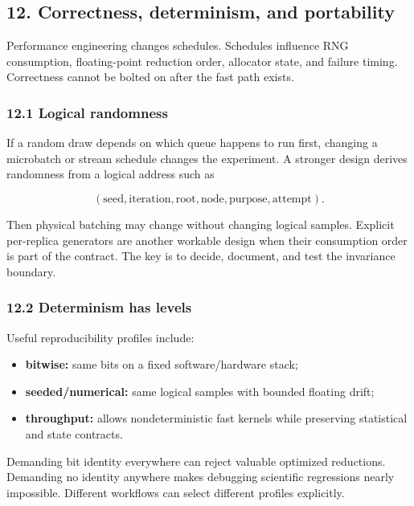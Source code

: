 \documentclass[
  10pt,
  letterpaper,
]{article}
\providecommand{\tightlist}{%
  \setlength{\itemsep}{0pt}\setlength{\parskip}{0pt}}
\begin{document}
\subsection{12. Correctness, determinism, and
portability}\label{12-correctness-determinism-and-portability}

Performance engineering changes schedules. Schedules influence RNG
consumption, floating-point reduction order, allocator state, and
failure timing. Correctness cannot be bolted on after the fast path
exists.

\subsubsection{12.1 Logical randomness}\label{121-logical-randomness}

If a random draw depends on which queue happens to run first, changing a
microbatch or stream schedule changes the experiment. A stronger design
derives randomness from a logical address such as

\[
(\text{seed},\text{iteration},\text{root},\text{node},\text{purpose},\text{attempt}).
\]

Then physical batching may change without changing logical samples.
Explicit per-replica generators are another workable design when their
consumption order is part of the contract. The key is to decide,
document, and test the invariance boundary.

\subsubsection{12.2 Determinism has
levels}\label{122-determinism-has-levels}

Useful reproducibility profiles include:

\begin{itemize}
\tightlist
\item
  \textbf{bitwise:} same bits on a fixed software/hardware stack;
\item
  \textbf{seeded/numerical:} same logical samples with bounded floating
  drift;
\item
  \textbf{throughput:} allows nondeterministic fast kernels while
  preserving statistical and state contracts.
\end{itemize}

Demanding bit identity everywhere can reject valuable optimized
reductions. Demanding no identity anywhere makes debugging scientific
regressions nearly impossible. Different workflows can select different
profiles explicitly.
\end{document}
